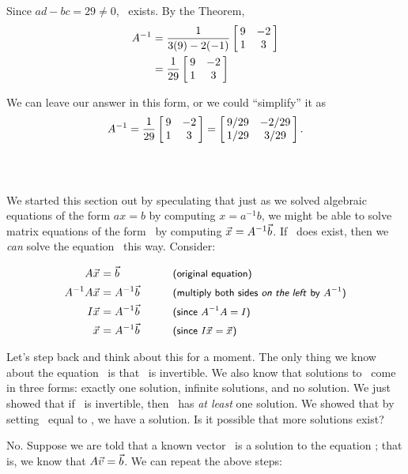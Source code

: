 \enlargethispage{2\baselineskip}

{Since $ad-bc = 29 \neq 0$, \ttai\ exists. By the Theorem, \begin{align*} \ttai &= \frac{1}{3(9)-2(-1)}\bmx{cc}9&-2\\1&3\emx \\
&= \frac{1}{29}\bmx{cc}9&-2\\1&3\emx
\end{align*}

We can leave our answer in this form, or we could ``simplify'' it as $$\ttai = \frac{1}{29}\bmx{cc}9&-2\\1&3\emx = \bmx{cc} 9/29 & -2/29\\1/29 & 3/29\emx.$$\ }\\ %

We started this section out by speculating that just as we solved algebraic equations of the form $ax=b$ by computing $x = a^{-1}b$, we might be able to solve matrix equations of the form \ttaxb\ by computing $\vx = \ttai\vb$. If \ttai\ does exist, then we \textit{can} solve the equation \ttaxb\ this way. Consider:

\begin{align*} \tta \vx &= \vb & & \textsf{\hskip 20pt  \small(original equation)}\\ 
\ttai\tta\vx &= \ttai\vb & &\textsf{\hskip 20 pt \small (multiply both sides \textit{on the left} by \ttai)}\\ 
\tti\vx &= \ttai\vb & &\textsf{\hskip 20 pt \small (since $\ttai\tta=\tti$)} \\ 
\vx &= \ttai\vb & &\textsf{\hskip 20 pt \small (since $\tti\vx = \vx$)} \end{align*}

Let's step back and think about this for a moment. The only thing we know about the equation \ttaxb\ is that \tta\ is invertible. We also know that solutions to \ttaxb\ come in three forms: exactly one solution, infinite solutions, and no solution. We just showed that if \tta\ is invertible, then \ttaxb\ has \textit{at least} one solution. We showed that by setting \vx\ equal to  \ttai\vb, we have a solution. Is it possible that more solutions exist?

No. Suppose we are told that a known vector \vv\ is a solution to the equation \ttaxb; that is, we know that $\tta\vv=\vb$. We can repeat the above steps:

